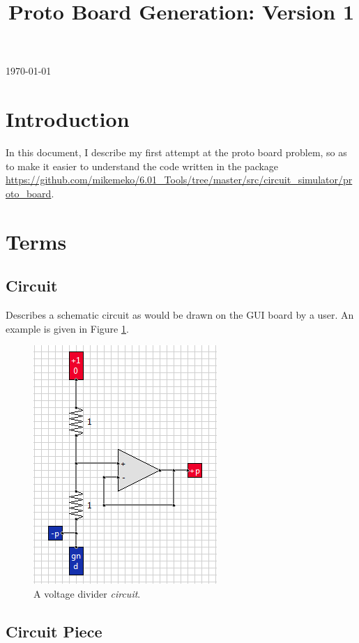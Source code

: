 \documentclass[12pt]{amsart}
\title{Proto Board Generation: Version 1}
\begin{document}
\today
\maketitle

\section{Introduction}

In this document, I describe my first attempt at the proto board problem, so as to make it easier to understand the code written in the package \url{https://github.com/mikemeko/6.01_Tools/tree/master/src/circuit_simulator/proto_board}.

\section{Terms}

\subsection{Circuit}

Describes a schematic circuit as would be drawn on the GUI board by a user. An example is given in Figure \ref{fig:circuit}.

\begin{figure}
\includegraphics{Images/Circuit.png}
\caption{A voltage divider \emph{circuit}.}
\label{fig:circuit}
\end{figure}

\subsection{Circuit Piece}
\end{document}
